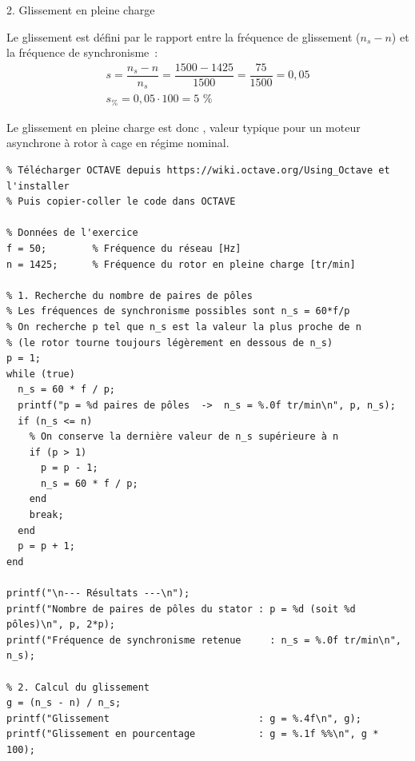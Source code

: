 \documentclass[a4paper,12pt,answers,addpoints]{exam}
\begin{document}
\begin{questions}
\begin{solution}
2. Glissement en pleine charge

Le glissement est défini par le rapport entre la fréquence de glissement ($n_s - n$) et la fréquence de synchronisme~:
\begin{align*}
    s = \dfrac{n_s - n}{n_s} = \dfrac{1500 - 1425}{1500} = \dfrac{75}{1500} = 0,05 \\[6pt]
    s_{\%} = 0,05 \cdot 100 = 5 \text{ \%}
\end{align*}

Le glissement en pleine charge est donc , valeur typique pour un moteur asynchrone à rotor à cage en régime nominal.
\newpage
\begin{verbatim}
% Télécharger OCTAVE depuis https://wiki.octave.org/Using_Octave et l'installer
% Puis copier-coller le code dans OCTAVE

% Données de l'exercice
f = 50;        % Fréquence du réseau [Hz]
n = 1425;      % Fréquence du rotor en pleine charge [tr/min]

% 1. Recherche du nombre de paires de pôles
% Les fréquences de synchronisme possibles sont n_s = 60*f/p
% On recherche p tel que n_s est la valeur la plus proche de n
% (le rotor tourne toujours légèrement en dessous de n_s)
p = 1;
while (true)
  n_s = 60 * f / p;
  printf("p = %d paires de pôles  ->  n_s = %.0f tr/min\n", p, n_s);
  if (n_s <= n)
    % On conserve la dernière valeur de n_s supérieure à n
    if (p > 1)
      p = p - 1;
      n_s = 60 * f / p;
    end
    break;
  end
  p = p + 1;
end

printf("\n--- Résultats ---\n");
printf("Nombre de paires de pôles du stator : p = %d (soit %d pôles)\n", p, 2*p);
printf("Fréquence de synchronisme retenue     : n_s = %.0f tr/min\n", n_s);

% 2. Calcul du glissement
g = (n_s - n) / n_s;
printf("Glissement                          : g = %.4f\n", g);
printf("Glissement en pourcentage           : g = %.1f %%\n", g * 100);
\end{verbatim}

\end{solution}
\end{questions}
\end{document}
